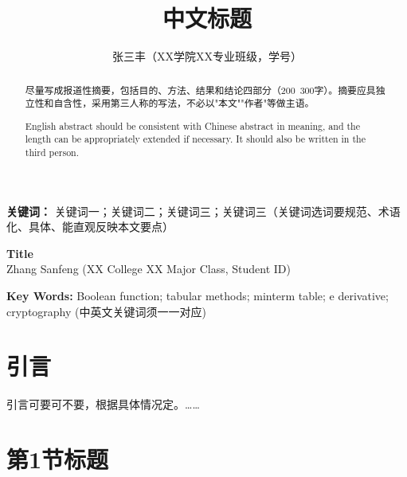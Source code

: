 \documentclass[UTF8, 12pt]{ctexart}
\begin{document}
\title{中文标题}

\author{张三丰（XX学院XX专业班级，学号）}

\date{}
\maketitle

\begin{abstract}

尽量写成报道性摘要，包括目的、方法、结果和结论四部分（200~300字）。摘要应具独立性和自含性，采用第三人称的写法，不必以"本文""作者"等做主语。

\end{abstract}

\noindent

\textbf{关键词：} 关键词一；关键词二；关键词三；关键词三（关键词选词要规范、术语化、具体、能直观反映本文要点）

\renewcommand{\abstractname}{Title}

\begin{center}
  \textbf{Title}\\
  \vspace{0.5em}
  Zhang Sanfeng (XX College XX Major Class, Student ID)
\end{center}

\begin{abstract}

    English abstract should be consistent with Chinese abstract in meaning, and the length can be appropriately extended if necessary. It should also be written in the third person.

\end{abstract}

\noindent
\textbf{Key Words:} Boolean function; tabular methods; minterm table; e derivative; cryptography (中英文关键词须一一对应)

\section{引言}

引言可要可不要，根据具体情况定。……

\section{第1节标题}
\end{document}
